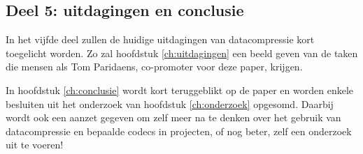 \subsection{Deel 5: uitdagingen en conclusie}
\label{sec:opzet-bachelorproef-deel-5}

In het vijfde deel zullen de huidige uitdagingen van \gls{datacompressie} kort toegelicht worden. Zo zal hoofdstuk \ref{ch:uitdagingen} een beeld geven van de taken die mensen als Tom Paridaens, co-promoter voor deze paper, krijgen.

In hoofdstuk \ref{ch:conclusie} wordt kort teruggeblikt op de paper en worden enkele besluiten uit het onderzoek van hoofdstuk \ref{ch:onderzoek} opgesomd. Daarbij wordt ook een aanzet gegeven om zelf meer na te denken over het gebruik van \gls{datacompressie} en bepaalde  \glspl{codec} in projecten, of nog beter, zelf een onderzoek uit te voeren!
